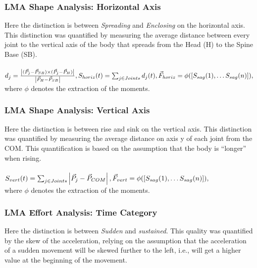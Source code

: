 \documentclass[11pt,twocolumn,varwidth=true,a4paper,fleqn]{article}
\begin{document}
\subsubsection{LMA Shape Analysis: Horizontal Axis}
Here the distinction is between \textit{Spreading} and \textit{Enclosing} on the horizontal axis.
This distinction was quantified by measuring the average distance between every joint to 
the vertical axis of the body that spreads from the Head (H) to the Spine Base (SB).
\\
\\$d_{j} = \frac{\left|(\vec{P}_{j}-\vec{P}_{SB})\times
(\vec{P}_{j}-\vec{P}_{H})\right|}{\left|\vec{P}_{H}-\vec{P}_{SB}\right|},
\\
\\S_{horiz}(t) = \sum_{j \in Joints} d_{j}(t),
\\
\\\vec{F}_{horiz} = \phi([S_{sag}(1), \ldots S_{sag}(n)]),$
\\where $\phi$ denotes the extraction of the moments.
\subsubsection{LMA Shape Analysis: Vertical Axis}
Here the distinction is between rise and sink on the vertical axis.
This distinction was quantified by measuring the average distance on axis y of each
joint from the COM. This quantification is based on the assumption that the body
is ``longer'' when rising.
\\
\\$S_{vert}(t) = \sum_{j \in Joints}
\left|\vec{P}_{j}-\vec{P}_{COM}\right|,
\\
\\\vec{F}_{vert} = \phi([S_{sag}(1), \ldots S_{sag}(n)]),$
\\where $\phi$ denotes the extraction of the moments.
\subsubsection{LMA Effort Analysis: Time Category}
Here the distinction is between \textit{Sudden} and \textit{sustained}. This quality was 
quantified by the skew of the acceleration, relying on the assumption that the
acceleration of a sudden movement will be skewed further to the left, i.e., will get
a higher value at the beginning of the movement.
\end{document}
